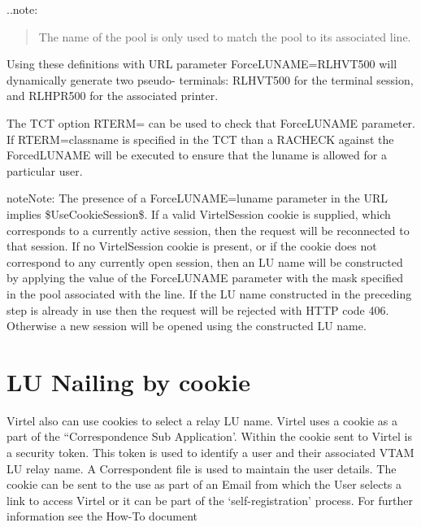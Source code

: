 \documentclass[letterpaper,10pt,english]{sphinxmanual}
\begin{document}
..note:
\begin{quote}

The name of the pool is only used to match the pool to its associated line.
\end{quote}

Using these definitions with URL parameter ForceLUNAME=RLHVT500 will dynamically generate two pseudo- terminals: RLHVT500 for the terminal session, and RLHPR500 for the associated printer.

The TCT option RTERM= can be used to check that ForceLUNAME parameter. If RTERM=classname is specified in the TCT than a RACHECK against the ForcedLUNAME will be executed to ensure that the luname is allowed for a particular user.

\begin{sphinxadmonition}{note}{Note:}
The presence of a ForceLUNAME=luname parameter in the URL implies \$UseCookieSession\$. If a valid VirtelSession cookie is supplied, which corresponds to a currently active session, then the request will be reconnected to that session. If no VirtelSession cookie is present, or if the cookie does not correspond to any currently open session, then an LU name will be constructed by applying the value of the ForceLUNAME parameter with the mask specified in the pool associated with the line. If the LU name constructed in the preceding step is already in use then the request will be rejected with HTTP code 406. Otherwise a new session will be opened using the constructed LU name.
\end{sphinxadmonition}

\newpage


\section{LU Nailing by cookie}
\label{\detokenize{connectivity_guide:index-153}}\label{\detokenize{connectivity_guide:lu-nailing-by-cookie}}
Virtel also can use cookies to select a relay LU name. Virtel uses a cookie as a part of the “Correspondence Sub Application’. Within the cookie sent to Virtel is a security token. This token is used to identify a user and their associated VTAM LU relay name. A Correspondent file is used to maintain the user details. The cookie can be sent to the use as part of an Email from which the User selects a link to access Virtel or it can be part of the ‘self-registration’ process. For further information see the How-To document 
\end{document}
